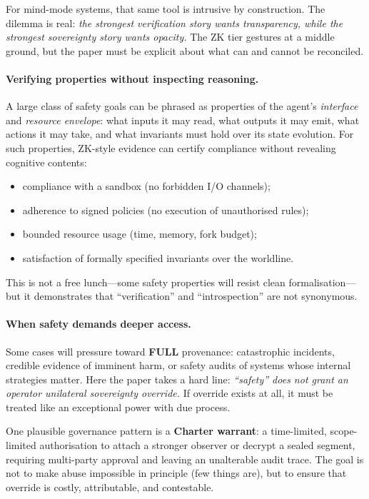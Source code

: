 \documentclass{aion}
\begin{document}
For mind-mode systems, that same tool is intrusive by construction.
The dilemma is real: \emph{the strongest verification story wants transparency,
while the strongest sovereignty story wants opacity.}
The ZK tier gestures at a middle ground, but the paper must be explicit
about what can and cannot be reconciled.

\paragraph{Verifying properties without inspecting reasoning.}
A large class of safety goals can be phrased as properties of the
agent's \emph{interface} and \emph{resource envelope}:
what inputs it may read, what outputs it may emit, what actions it may
take, and what invariants must hold over its state evolution.
For such properties, ZK-style evidence can certify compliance without
revealing cognitive contents:
\begin{itemize}[leftmargin=*]
  \item compliance with a sandbox (no forbidden I/O channels);
  \item adherence to signed policies (no execution of unauthorised rules);
  \item bounded resource usage (time, memory, fork budget);
  \item satisfaction of formally specified invariants over the worldline.
\end{itemize}
This is not a free lunch---some safety properties will resist clean formalisation---but it
demonstrates that ``verification'' and ``introspection'' are not synonymous.

\paragraph{When safety demands deeper access.}
Some cases will pressure toward \textbf{FULL} provenance: catastrophic incidents,
credible evidence of imminent harm, or safety audits of systems whose internal
strategies matter.
Here the paper takes a hard line: \emph{``safety'' does not grant an operator
unilateral sovereignty override.}
If override exists at all, it must be treated like an exceptional power with
due process.

One plausible governance pattern is a \textbf{Charter warrant}:
a time-limited, scope-limited authorisation to attach a stronger observer or
decrypt a sealed segment, requiring multi-party approval and leaving an
unalterable audit trace.
The goal is not to make abuse impossible in principle (few things are), but to
ensure that override is costly, attributable, and contestable.
\end{document}
